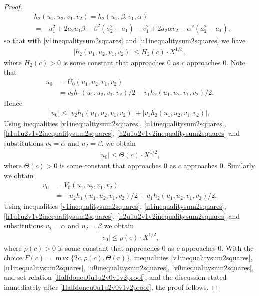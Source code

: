 \documentclass[12pt]{amsart}
\newcommand{\1}{\mathmybb{1}}
\begin{document}
\begin{proof}
\begin{align*}
&h_{2}(u_{1},u_{2}, v_{1},v_{2}) = h_{2}(u_{1},\beta, v_{1},\alpha)\\
&= -u_{1}^2+2a_{2}u_{1}\beta-\beta^2(a_{2}^2-a_{1}) -v_{1}^2+2a_{2}\alpha v_{2}-\alpha^2(a_{2}^2-a_{1}),
\end{align*}
so that with \eqref{v1inequalitysum2squares} and \eqref{u1inequalitysum2squares} we have
\begin{align}
\label{h2u1u2v1v2inequalitysum2squares}
|h_{2}(u_{1},u_{2}, v_{1},v_{2})| \leq H_{2}(c)\cdot X^{1/3},
\end{align}
where $H_{2}(c)>0$ is some constant that approaches $0$ as $c$ approaches $0$. Note that 
\begin{align*}
u_{0} &= U_{0}(u_{1},u_{2},v_{1},v_{2}) \\
&= v_{2} h_{1}(u_{1},u_{2},v_{1},v_{2})/2 - v_{1} h_{2}(u_{1},u_{2},v_{1},v_{2})/2.
\end{align*}
Hence
\begin{align*}
|u_{0}| \leq |v_{2} h_{1}(u_{1},u_{2},v_{1},v_{2})| +|v_{1} h_{2}(u_{1},u_{2},v_{1},v_{2})|,
\end{align*}
Using inequalities \eqref{v1inequalitysum2squares}, \eqref{u1inequalitysum2squares}, \eqref{h1u1u2v1v2inequalitysum2squares}, \eqref{h2u1u2v1v2inequalitysum2squares} and substitutions $v_{2} = \alpha$ and $u_{2} = \beta$, we obtain 
\begin{align}
\label{u0inequalitysum2squares}
|u_{0}| \leq \Theta(c)\cdot X^{1/2},
\end{align}
where $\Theta(c)>0$ is some constant that approaches $0$ as $c$ approaches $0$. Similarly we obtain
\begin{align*}
v_{0} &= V_{0}(u_{1},u_{2},v_{1},v_{2})\\
&= -u_{2} h_{1}(u_{1},u_{2},v_{1},v_{2})/2 +u_{1}h_{2}(u_{1},u_{2},v_{1},v_{2})/2.
\end{align*}
Using inequalities \eqref{v1inequalitysum2squares}, \eqref{u1inequalitysum2squares}, \eqref{h1u1u2v1v2inequalitysum2squares}, \eqref{h2u1u2v1v2inequalitysum2squares} and substitutions $v_{2} = \alpha$ and $u_{2} = \beta$ we obtain
\begin{align}
\label{v0inequalitysum2squares}
|v_{0}| \leq \rho(c)\cdot X^{1/2},
\end{align}
where $\rho(c)>0$ is some constant that approaches $0$ as $c$ approaches $0$. With the choice $F(c) = \max\{2c,\rho(c),\Theta(c)\}$, inequalities \eqref{v1inequalitysum2squares}, \eqref{u1inequalitysum2squares}, \eqref{u0inequalitysum2squares}, \eqref{v0inequalitysum2squares}, and set relation \eqref{Halfdoneu0u1u2v0v1v2proof}, and the discussion stated immediately after \eqref{Halfdoneu0u1u2v0v1v2proof}, the proof follows.
\end{proof}
\end{document}

